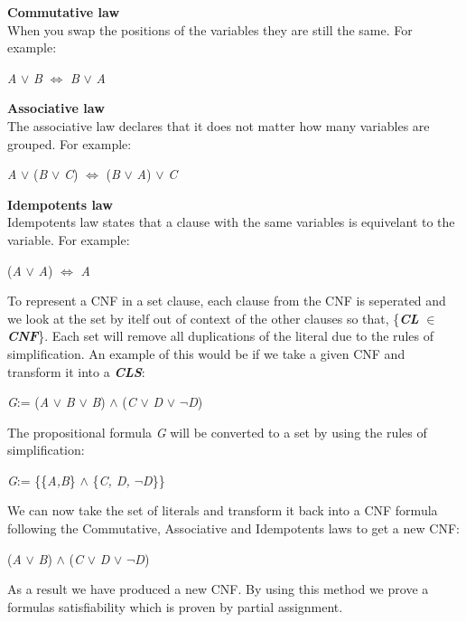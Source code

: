 \documentclass[11pt,a4paper]{article}
\begin{document}
\textbf{Commutative law}\\
When you swap the positions of the variables they are still the same. For example:
\begin{center}
\textit{A} $\lor$ \textit{B} $\Leftrightarrow$ \textit{B} $\lor$ \textit{A}
\end{center}

\textbf{Associative law}\\
The associative law declares that it does not matter how many variables are grouped. For example:

\begin{center}
\textit{A} $\lor$ (\textit{B} $\lor$ \textit{C}) $\Leftrightarrow$ (\textit{B} $\lor$ \textit{A}) $\lor$ \textit{C}
\end{center}

\textbf{Idempotents law}\\
Idempotents law states that a clause with the same variables is equivelant to the variable. For example:

\begin{center}
(\textit{A} $\lor$ \textit{A}) $\Leftrightarrow$ \textit{A}
\end{center}

To represent a CNF in a set clause, each clause from the CNF is seperated and we look at the set by itelf out of context of the other clauses so that, \{\textbf{\textit{CL}} $\in$ \textbf{\textit{CNF}}\}. Each set will remove all duplications of the literal due to the rules of simplification. An example of this would be if we take a given CNF and transform it into a \textbf{\textit{CLS}}: 

\begin{center}
\textit{G}:= (\textit{A} $\lor$ \textit{B} $\lor$ \textit{B}) $\land$ (\textit{C} $\lor$ \textit{D} $\lor$ $\neg$\textit{D})
\end{center}

The propositional formula \textit{G} will be converted to a set by using the rules of simplification:

\begin{center}
\textit{G}:= \{\{\textit{A,B}\} $\land$ \{\textit{C, D, $\neg$D}\}\} 
\end{center}

We can now take the set of literals and transform it back into a CNF formula following the Commutative, Associative and Idempotents laws to get a new CNF:

\begin{center}
(\textit{A} $\lor$ \textit{B}) $\land$ (\textit{C} $\lor$ \textit{D} $\lor$ $\neg$\textit{D})
\end{center}
As a result we have produced a new CNF. By using this method we prove a formulas satisfiability which is proven by partial assignment. 
\end{document}
